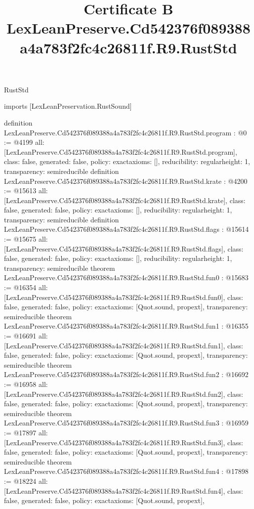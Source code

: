 \begin{lexlean}{RustStd}
\title{Certificate B LexLeanPreserve.Cd542376f089388a4a783f2fc4c26811f.R9.RustStd}
\begin{coremodule}
imports [LexLeanPreservation.RustSound]

definition LexLeanPreserve.Cd542376f089388a4a783f2fc4c26811f.R9.RustStd.program : @0 := @4199 {
  all: [LexLeanPreserve.Cd542376f089388a4a783f2fc4c26811f.R9.RustStd.program],
  class: false,
  generated: false,
  policy: exact{axioms: []},
  reducibility: regular{height: 1},
  transparency: semireducible
}
definition LexLeanPreserve.Cd542376f089388a4a783f2fc4c26811f.R9.RustStd.krate : @4200 := @15613 {
  all: [LexLeanPreserve.Cd542376f089388a4a783f2fc4c26811f.R9.RustStd.krate],
  class: false,
  generated: false,
  policy: exact{axioms: []},
  reducibility: regular{height: 1},
  transparency: semireducible
}
definition LexLeanPreserve.Cd542376f089388a4a783f2fc4c26811f.R9.RustStd.flags : @15614 := @15675 {
  all: [LexLeanPreserve.Cd542376f089388a4a783f2fc4c26811f.R9.RustStd.flags],
  class: false,
  generated: false,
  policy: exact{axioms: []},
  reducibility: regular{height: 1},
  transparency: semireducible
}
theorem LexLeanPreserve.Cd542376f089388a4a783f2fc4c26811f.R9.RustStd.fun0 : @15683 := @16354 {
  all: [LexLeanPreserve.Cd542376f089388a4a783f2fc4c26811f.R9.RustStd.fun0],
  class: false,
  generated: false,
  policy: exact{axioms: [Quot.sound, propext]},
  transparency: semireducible
}
theorem LexLeanPreserve.Cd542376f089388a4a783f2fc4c26811f.R9.RustStd.fun1 : @16355 := @16691 {
  all: [LexLeanPreserve.Cd542376f089388a4a783f2fc4c26811f.R9.RustStd.fun1],
  class: false,
  generated: false,
  policy: exact{axioms: [Quot.sound, propext]},
  transparency: semireducible
}
theorem LexLeanPreserve.Cd542376f089388a4a783f2fc4c26811f.R9.RustStd.fun2 : @16692 := @16958 {
  all: [LexLeanPreserve.Cd542376f089388a4a783f2fc4c26811f.R9.RustStd.fun2],
  class: false,
  generated: false,
  policy: exact{axioms: [Quot.sound, propext]},
  transparency: semireducible
}
theorem LexLeanPreserve.Cd542376f089388a4a783f2fc4c26811f.R9.RustStd.fun3 : @16959 := @17897 {
  all: [LexLeanPreserve.Cd542376f089388a4a783f2fc4c26811f.R9.RustStd.fun3],
  class: false,
  generated: false,
  policy: exact{axioms: [Quot.sound, propext]},
  transparency: semireducible
}
theorem LexLeanPreserve.Cd542376f089388a4a783f2fc4c26811f.R9.RustStd.fun4 : @17898 := @18224 {
  all: [LexLeanPreserve.Cd542376f089388a4a783f2fc4c26811f.R9.RustStd.fun4],
  class: false,
  generated: false,
  policy: exact{axioms: [Quot.sound, propext]},
}
\end{coremodule}
\end{lexlean}
